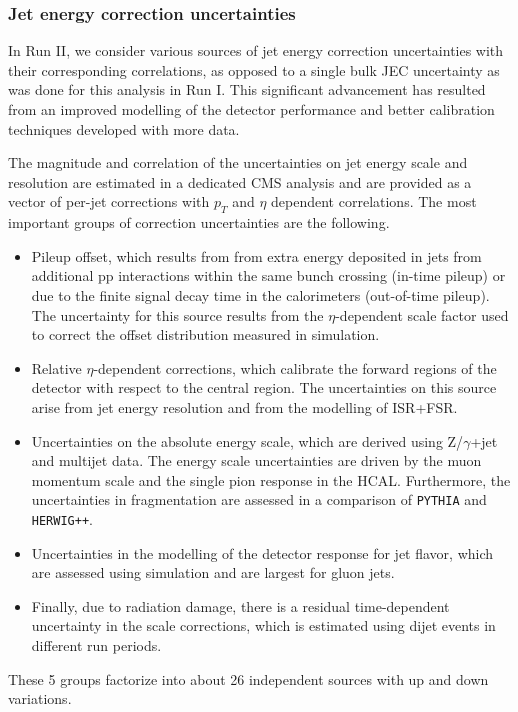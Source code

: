 \subsubsection{Jet energy correction uncertainties}
\label{sec:jec_unc}
In Run II, we consider various sources of jet energy correction uncertainties with their corresponding correlations, as opposed to a single bulk JEC uncertainty as was done for this analysis in Run I. This significant advancement has resulted from an improved modelling of the detector performance and better calibration techniques developed with more data. 

The magnitude and correlation of the uncertainties on jet energy scale and resolution are estimated in a dedicated CMS analysis and are provided as a vector of per-jet corrections with $p_T$ and $\eta$ dependent correlations. The most important groups of correction uncertainties are the following.
\begin{itemize}
\item Pileup offset, which results from from extra energy deposited in jets from additional pp interactions within the same bunch crossing (in-time pileup) or due to the finite signal decay time in the calorimeters (out-of-time pileup). The uncertainty for this source results from the $\eta$-dependent scale factor used to correct the offset distribution measured in simulation.
\item Relative $\eta$-dependent corrections, which calibrate the forward regions of the detector with respect to the central region. The uncertainties on this source arise from jet energy resolution and from the modelling of ISR+FSR.
\item Uncertainties on the absolute energy scale, which are derived using Z/$\gamma$+jet and multijet data. The energy scale uncertainties are driven by the muon momentum scale and the single pion response in the HCAL. Furthermore, the uncertainties in fragmentation are assessed in a comparison of \texttt{PYTHIA} and \texttt{HERWIG++}.
\item Uncertainties in the modelling of the detector response for jet flavor, which are assessed using simulation and are largest for gluon jets.
\item Finally, due to radiation damage, there is a residual time-dependent uncertainty in the scale corrections, which is estimated using dijet events in different run periods.
\end{itemize}
These 5 groups factorize into about 26 independent sources with up and down variations.

